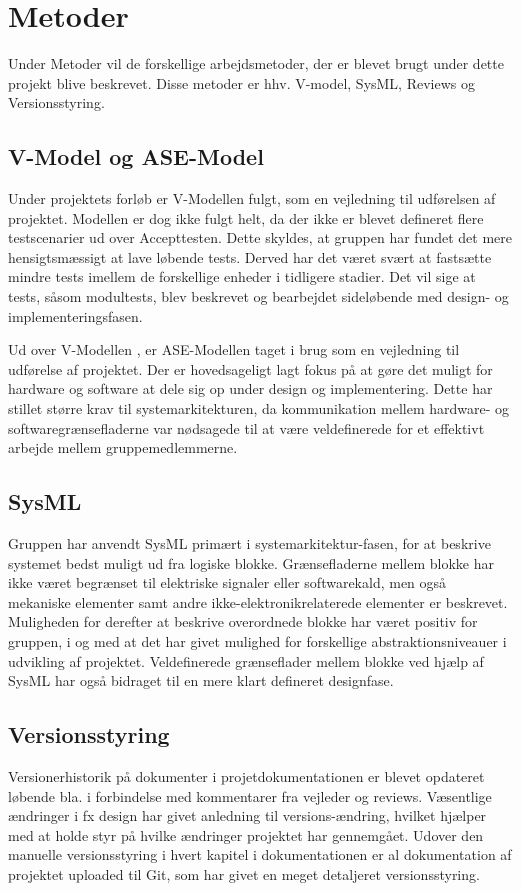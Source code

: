 \section{Metoder} \label{ch:Metoder}

Under Metoder vil de forskellige arbejdsmetoder, der er blevet brugt under dette projekt blive beskrevet. 
Disse metoder er hhv. V-model, SysML, Reviews og Versionsstyring.

\subsection{V-Model og ASE-Model} 
Under projektets forløb er V-Modellen fulgt, som en vejledning til udførelsen af projektet. 
Modellen er dog ikke fulgt helt, da der ikke er blevet defineret flere testscenarier ud over Accepttesten. 
Dette skyldes, at gruppen har fundet det mere hensigtsmæssigt at lave løbende tests. Derved har det været svært at fastsætte mindre tests imellem de forskellige enheder i tidligere stadier. 
Det vil sige at tests, såsom modultests, blev beskrevet og bearbejdet sideløbende med design- og implementeringsfasen.

Ud over V-Modellen \cite{lib:T-006}, er ASE-Modellen \cite{lib:vejledning} taget i brug som en vejledning til udførelse af projektet. 
Der er hovedsageligt lagt fokus på at gøre det muligt for hardware og software at dele sig op under design og implementering. 
Dette har stillet større krav til systemarkitekturen, da kommunikation mellem hardware- og softwaregrænsefladerne var nødsagede til at være veldefinerede for et effektivt arbejde mellem gruppemedlemmerne.

\subsection{SysML}
Gruppen har anvendt SysML primært i systemarkitektur-fasen, for at beskrive systemet bedst muligt ud fra logiske blokke.
Grænsefladerne mellem blokke har ikke været begrænset til elektriske signaler eller softwarekald, men også mekaniske elementer samt andre ikke-elektronikrelaterede elementer er beskrevet. 
Muligheden for derefter at beskrive overordnede blokke har været positiv for gruppen, i og med at det har givet mulighed for forskellige abstraktionsniveauer i udvikling af projektet.
Veldefinerede grænseflader mellem blokke ved hjælp af SysML har også bidraget til en mere klart defineret designfase.

\subsection{Versionsstyring}
Versionerhistorik på dokumenter i projetdokumentationen er blevet opdateret løbende bla. i forbindelse med kommentarer fra vejleder og reviews. 
Væsentlige ændringer i fx design har givet anledning til versions-ændring, hvilket hjælper med at holde styr på hvilke ændringer projektet har gennemgået.
Udover den manuelle versionsstyring i hvert kapitel i dokumentationen er al dokumentation af projektet uploaded til Git, som har givet en meget detaljeret versionsstyring.

